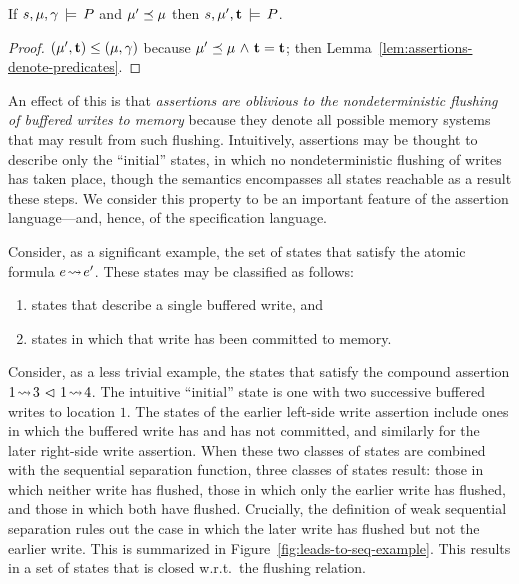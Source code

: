 \documentclass[11pt]{report}         %
\begin{document}
\begin{corollary}
  If $s,\mu,\gamma \,\models\, P$ and $\mu' \preceq \mu$ then $s,\mu',\mathbf{t} \,\models\, P$. 
\end{corollary}

\begin{proof}
$(\mu',\mathbf{t}) \leq (\mu,\gamma)$ because $\mu' \preceq \mu \operatorname{\,\wedge\,} \mathbf{t} = \mathbf{t}$; then Lemma~\ref{lem:assertions-denote-predicates}. 
\end{proof}

An effect of this is that \emph{assertions are oblivious to the nondeterministic flushing of buffered writes to memory} because they denote all possible memory systems that may result from such flushing. Intuitively, assertions may be thought to describe only the ``initial'' states, in which no nondeterministic flushing of writes has taken place, though the semantics encompasses all states reachable as a result these steps. We consider this property to be an important feature of the assertion language---and, hence, of the specification language. 

Consider, as a significant example, the set of states that satisfy the atomic formula $e \!\leadsto\! e'$. These states may be classified as follows: \begin{enumerate}
    \item states that describe a single buffered write, and 
    \item states in which that write has been committed to memory. 
\end{enumerate} Consider, as a less trivial example, the states that satisfy the compound assertion $1 \!\leadsto\! 3 \operatorname{\,\vartriangleleft\,} 1 \!\leadsto\! 4$. The intuitive ``initial'' state is one with two successive buffered writes to location $1$. The states of the earlier left-side write assertion include ones in which the buffered write has and has not committed, and similarly for the later right-side write assertion. When these two classes of states are combined with the sequential separation function, three classes of states result: those in which neither write has flushed, those in which only the earlier write has flushed, and those in which both have flushed. Crucially, the definition of weak sequential separation rules out the case in which the later write has flushed but not the earlier write. This is summarized in Figure~\ref{fig:leads-to-seq-example}. This results in a set of states that is closed w.r.t.\ the flushing relation. 
 
\end{document}
